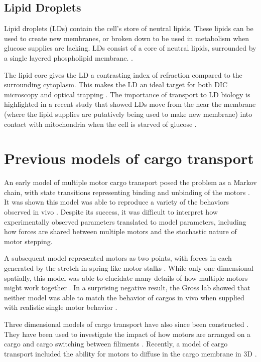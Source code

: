 \subsection{Lipid Droplets}

Lipid droplets (LDs) contain the cell's store of neutral lipids. These lipids can be used to create new membranes, or broken down to be used in metabolism when glucose supplies are lacking. LDs consist of a core of neutral lipids, surrounded by a single layered phospholipid membrane. \cite{Welte2015}.

The lipid core gives the LD a contrasting index of refraction compared to the surrounding cytoplasm. This makes the LD an ideal target for both DIC microscopy and optical trapping \cite{Reddy2016}. The importance of transport to LD biology is highlighted in a recent study that showed LDs move from the near the membrane (where the lipid supplies are putatively being used to make new membrane) into contact with mitochondria when the cell is starved of glucose \cite{Herms2015}.

\section{Previous models of cargo transport}

An early model of multiple motor cargo transport posed the problem as a Markov chain, with state transitions representing binding and unbinding of the motors \cite{Klumpp2005}. It was shown this model was able to reproduce a variety of the behaviors observed in vivo \cite{Muller2008}. Despite its success, it was difficult to interpret how experimentally observed parameters translated to model parameters, including how forces are shared between multiple motors and the stochastic nature of motor stepping.

A subsequent model represented motors as two points, with forces in each generated by the stretch in spring-like motor stalks \cite{Kunwar2008}. While only one dimensional spatially, this model was able to elucidate many details of how multiple motors might work together \cite{Kunwar2010}. In a surprising negative result, the Gross lab showed that neither model was able to match the behavior of cargos in vivo when supplied with realistic single motor behavior \cite{Kunwar2011}.

Three dimensional models of cargo transport have also since been constructed \cite{Korn2009,Erickson2011,Lombardo2017}. They have been used to investigate the impact of how motors are arranged on a cargo \cite{Erickson2011} and cargo switching between filiments \cite{Erickson2013}. Recently, a model of cargo transport included the ability for motors to diffuse in the cargo membrane in 3D \cite{Lombardo2017}.
